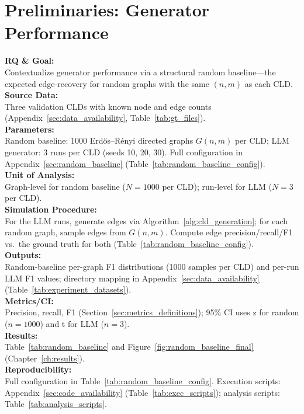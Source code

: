 \section{Preliminaries: Generator Performance}
\label{sec:random_baseline_method}

\noindent\textbf{RQ \& Goal:}\\
Contextualize generator performance via a structural random baseline---the expected edge-recovery for random graphs with the same $(n,m)$ as each CLD.\\
\textbf{Source Data:}\\
Three validation CLDs with known node and edge counts (Appendix~\ref{sec:data_availability}, Table~\ref{tab:gt_files}).\\
\textbf{Parameters:}\\
Random baseline: 1000 Erd\H{o}s--R\'enyi directed graphs $G(n,m)$ per CLD; LLM generator: 3 runs per CLD (seeds 10, 20, 30). Full configuration in Appendix~\ref{sec:random_baseline} (Table~\ref{tab:random_baseline_config}).\\
\textbf{Unit of Analysis:}\\
Graph-level for random baseline ($N=1000$ per CLD); run-level for LLM ($N=3$ per CLD).\\
\textbf{Simulation Procedure:}\\
For the LLM runs, generate edges via Algorithm~\ref{alg:cld_generation}; for each random graph, sample edges from $G(n,m)$. Compute edge precision/recall/F1 vs.\ the ground truth for both (Table~\ref{tab:random_baseline_config}).\\
\textbf{Outputs:}\\
Random-baseline per-graph F1 distributions (1000 samples per CLD) and per-run LLM F1 values; directory mapping in Appendix~\ref{sec:data_availability} (Table~\ref{tab:experiment_datasets}).\\
\textbf{Metrics/CI:}\\
Precision, recall, F1 (Section~\ref{sec:metrics_definitions}); 95\% CI uses z for random ($n{=}1000$) and t for LLM ($n{=}3$).\\
\textbf{Results:}\\
Table~\ref{tab:random_baseline} and Figure~\ref{fig:random_baseline_final} (Chapter~\ref{ch:results}).\\
\textbf{Reproducibility:}\\
Full configuration in Table~\ref{tab:random_baseline_config}. Execution scripts: Appendix~\ref{sec:code_availability} (Table~\ref{tab:exec_scripts}); analysis scripts: Table~\ref{tab:analysis_scripts}.

